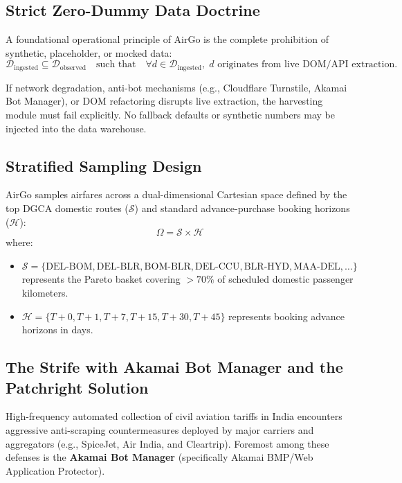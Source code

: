 \documentclass[11pt,a4paper]{article}
\begin{document}
\subsection{Strict Zero-Dummy Data Doctrine}
A foundational operational principle of AirGo is the complete prohibition of synthetic, placeholder, or mocked data:
\begin{equation}
\mathcal{D}_{\text{ingested}} \subseteq \mathcal{D}_{\text{observed}} \quad \text{such that} \quad \forall d \in \mathcal{D}_{\text{ingested}}, \; d \text{ originates from live DOM/API extraction.}
\end{equation}

If network degradation, anti-bot mechanisms (e.g., Cloudflare Turnstile, Akamai Bot Manager), or DOM refactoring disrupts live extraction, the harvesting module must fail explicitly. No fallback defaults or synthetic numbers may be injected into the data warehouse.

\subsection{Stratified Sampling Design}
AirGo samples airfares across a dual-dimensional Cartesian space defined by the top DGCA domestic routes ($\mathcal{S}$) and standard advance-purchase booking horizons ($\mathcal{H}$):
\begin{equation}
\Omega = \mathcal{S} \times \mathcal{H}
\end{equation}
where:
\begin{itemize}
    \item $\mathcal{S} = \{\text{DEL-BOM}, \text{DEL-BLR}, \text{BOM-BLR}, \text{DEL-CCU}, \text{BLR-HYD}, \text{MAA-DEL}, \dots\}$ represents the Pareto basket covering $>70\%$ of scheduled domestic passenger kilometers.
    \item $\mathcal{H} = \{T+0, T+1, T+7, T+15, T+30, T+45\}$ represents booking advance horizons in days.
\end{itemize}

\subsection{The Strife with Akamai Bot Manager and the Patchright Solution}
\label{sec:akamai_patchright}
High-frequency automated collection of civil aviation tariffs in India encounters aggressive anti-scraping countermeasures deployed by major carriers and aggregators (e.g., SpiceJet, Air India, and Cleartrip). Foremost among these defenses is the \textbf{Akamai Bot Manager} (specifically Akamai BMP/Web Application Protector).
\end{document}
